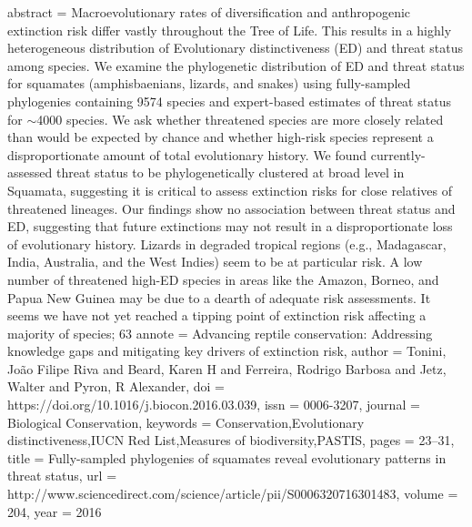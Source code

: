 {{{{{{abstract = {Macroevolutionary rates of diversification and anthropogenic extinction risk differ vastly throughout the Tree of Life. This results in a highly heterogeneous distribution of Evolutionary distinctiveness (ED) and threat status among species. We examine the phylogenetic distribution of ED and threat status for squamates (amphisbaenians, lizards, and snakes) using fully-sampled phylogenies containing 9574 species and expert-based estimates of threat status for $\sim$4000 species. We ask whether threatened species are more closely related than would be expected by chance and whether high-risk species represent a disproportionate amount of total evolutionary history. We found currently-assessed threat status to be phylogenetically clustered at broad level in Squamata, suggesting it is critical to assess extinction risks for close relatives of threatened lineages. Our findings show no association between threat status and ED, suggesting that future extinctions may not result in a disproportionate loss of evolutionary history. Lizards in degraded tropical regions (e.g., Madagascar, India, Australia, and the West Indies) seem to be at particular risk. A low number of threatened high-ED species in areas like the Amazon, Borneo, and Papua New Guinea may be due to a dearth of adequate risk assessments. It seems we have not yet reached a tipping point of extinction risk affecting a majority of species; 63%
annote = {Advancing reptile conservation: Addressing knowledge gaps and mitigating key drivers of extinction risk},
author = {Tonini, Jo{\~{a}}o Filipe Riva and Beard, Karen H and Ferreira, Rodrigo Barbosa and Jetz, Walter and Pyron, R Alexander},
doi = {https://doi.org/10.1016/j.biocon.2016.03.039},
issn = {0006-3207},
journal = {Biological Conservation},
keywords = {Conservation,Evolutionary distinctiveness,IUCN Red List,Measures of biodiversity,PASTIS},
pages = {23--31},
title = {{Fully-sampled phylogenies of squamates reveal evolutionary patterns in threat status}},
url = {http://www.sciencedirect.com/science/article/pii/S0006320716301483},
volume = {204},
year = {2016}
}

}}}}}}
